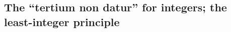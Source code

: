 \paragraph{} %

\paragraph{} %

\paragraph{} %

\subsection{The ``tertium non datur'' for integers; the least-integer principle}

\paragraph{} %

\paragraph{} %

\paragraph{} %

\paragraph{} %

\paragraph{} %

\paragraph{} %

\paragraph{} %

\paragraph{} %

